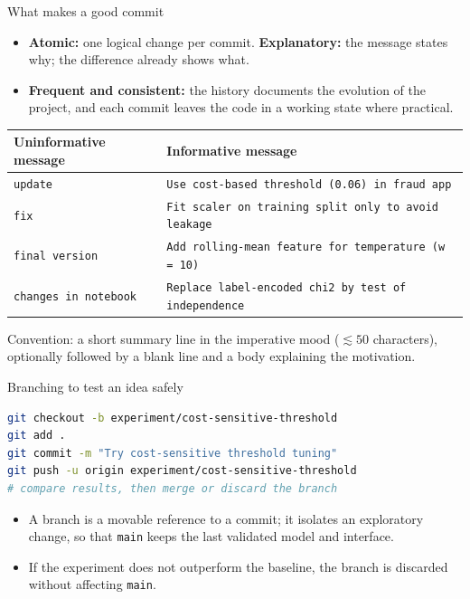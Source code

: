 \begin{frame}{What makes a good commit}
\begin{itemize}\footnotesize
\item \textbf{Atomic:} one logical change per commit. \textbf{Explanatory:} the message states why; the difference already shows what.
\item \textbf{Frequent and consistent:} the history documents the evolution of the project, and each commit leaves the code in a working state where practical.
\end{itemize}
\vspace{0.4em}
\begingroup\footnotesize
\renewcommand{\arraystretch}{1.3}
\begin{tabularx}{\textwidth}{>{\raggedright\arraybackslash}p{3.6cm} >{\raggedright\arraybackslash}X}
\bfseries Uninformative message & \bfseries Informative message \\
\toprule
\texttt{update} & \texttt{Use cost-based threshold (0.06) in fraud app} \\
\texttt{fix} & \texttt{Fit scaler on training split only to avoid leakage} \\
\texttt{final version} & \texttt{Add rolling-mean feature for temperature (w = 10)} \\
\texttt{changes in notebook} & \texttt{Replace label-encoded chi2 by test of independence} \\
\bottomrule
\end{tabularx}
\par\endgroup
\vspace{0.4em}
{\scriptsize Convention: a short summary line in the imperative mood ($\lesssim 50$ characters), optionally followed by a blank line and a body explaining the motivation.\par}
\coursefooter
\end{frame}

\begin{frame}[fragile]{Branching to test an idea safely}
\begin{lstlisting}[style=coursepython,language=bash]
git checkout -b experiment/cost-sensitive-threshold
git add .
git commit -m "Try cost-sensitive threshold tuning"
git push -u origin experiment/cost-sensitive-threshold
# compare results, then merge or discard the branch
\end{lstlisting}
\begin{itemize}
\item A branch is a movable reference to a commit; it isolates an exploratory change, so that \texttt{main} keeps the last validated model and interface.
\item If the experiment does not outperform the baseline, the branch is discarded without affecting \texttt{main}.
\end{itemize}
\coursefooter
\end{frame}

